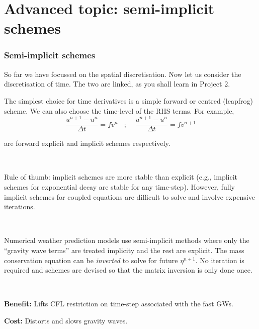 \documentclass[xcolor=dvipsnames]{beamer} %
\newcommand{\BEQ}{ \begin{equation}}
\newcommand{\EEQ}{ \end{equation}}
\newcommand{\BSS}{ \begin{scriptsize}}
\newcommand{\ESS}{ \end{scriptsize}}
\begin{document}
\section{Advanced topic: semi-implicit schemes}
\frame
{
\frametitle{Semi-implicit schemes}
\BSS



So far we have focussed on the spatial discretisation. Now let us
consider the discretisation of time. The two are linked, as you shall learn in Project 2.

The simplest choice for time derivatives is a simple forward or
centred (leapfrog) scheme. We can also choose the time-level of the RHS terms. For example,
\BEQ
\frac{u^{n+1}-u^n}{\Delta t}=fv^n ~~~~;~~~~~\frac{u^{n+1}-u^n}{\Delta t}=fv^{n+1}
\EEQ

are forward explicit and implicit schemes respectively.

~

Rule of thumb: implicit schemes are more stable than explicit
(e.g., implicit schemes for exponential decay are stable for any
time-step). However, fully implicit schemes for coupled equations are
difficult to solve and involve expensive iterations. 

~

Numerical weather prediction models use semi-implicit methods where
only the ``gravity wave terms'' are treated implicity and the rest are
explicit. The mass conservation equation can be {\em inverted} to
solve for future $\eta^{n+1}$. No iteration is required and schemes
are devised so that the matrix inversion is only done once. 

~

{\bf Benefit:} Lifts CFL restriction on time-step associated with
the fast GWs.

{\bf Cost:} Distorts and slows gravity waves.

\ESS
}
\end{document}
